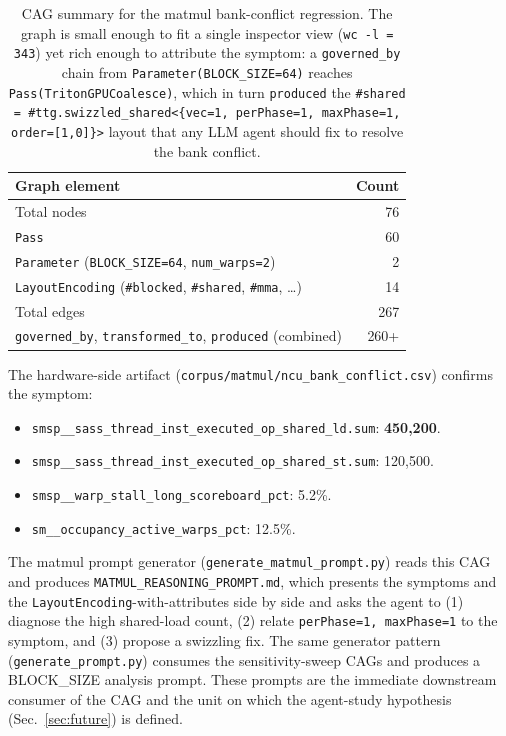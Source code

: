 \documentclass[10pt]{article}
\begin{document}
\begin{table}[h]
\centering\small
\begin{tabular}{@{}lr@{}}
\toprule
\textbf{Graph element} & \textbf{Count} \\ \midrule
Total nodes                                & 76 \\
\quad \texttt{Pass}                        & 60 \\
\quad \texttt{Parameter} (\texttt{BLOCK\_SIZE=64}, \texttt{num\_warps=2}) & 2 \\
\quad \texttt{LayoutEncoding} (\texttt{\#blocked}, \texttt{\#shared}, \texttt{\#mma}, \ldots) & 14 \\
Total edges                                & 267 \\
\quad \texttt{governed\_by}, \texttt{transformed\_to}, \texttt{produced} (combined) & 260+ \\
\bottomrule
\end{tabular}
\caption{CAG summary for the matmul bank-conflict regression. The graph is small enough to fit a single inspector view (\texttt{wc -l = 343}) yet rich enough to attribute the symptom: a \texttt{governed\_by} chain from \texttt{Parameter(BLOCK\_SIZE=64)} reaches \texttt{Pass(TritonGPUCoalesce)}, which in turn \texttt{produced} the \texttt{\#shared = \#ttg.swizzled\_shared<\{vec=1, perPhase=1, maxPhase=1, order=[1,0]\}>} layout that any LLM agent should fix to resolve the bank conflict.}
\label{tab:matmul}
\end{table}

The hardware-side artifact (\texttt{corpus/matmul/ncu\_bank\_conflict.csv}) confirms the symptom:
\begin{itemize}[leftmargin=*,itemsep=0.1em,topsep=0.2em]
  \item \texttt{smsp\_\_sass\_thread\_inst\_executed\_op\_shared\_ld.sum}: \textbf{450{,}200}.
  \item \texttt{smsp\_\_sass\_thread\_inst\_executed\_op\_shared\_st.sum}: 120{,}500.
  \item \texttt{smsp\_\_warp\_stall\_long\_scoreboard\_pct}: 5.2\%.
  \item \texttt{sm\_\_occupancy\_active\_warps\_pct}: 12.5\%.
\end{itemize}

The matmul prompt generator (\texttt{generate\_matmul\_prompt.py}) reads this CAG and produces \texttt{MATMUL\_REASONING\_PROMPT.md}, which presents the symptoms and the \texttt{LayoutEncoding}-with-attributes side by side and asks the agent to (1) diagnose the high shared-load count, (2) relate \texttt{perPhase=1, maxPhase=1} to the symptom, and (3) propose a swizzling fix. The same generator pattern (\texttt{generate\_prompt.py}) consumes the sensitivity-sweep CAGs and produces a BLOCK\_SIZE analysis prompt. These prompts are the immediate downstream consumer of the CAG and the unit on which the agent-study hypothesis (Sec.~\ref{sec:future}) is defined.
\end{document}
